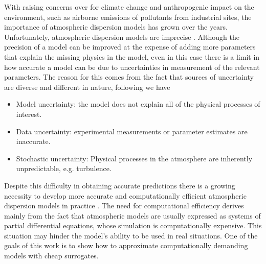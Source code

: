 \documentclass{sfuthesis}
\begin{document}
With raising concerns over for climate change and anthropogenic impact on the environment, such as 
airborne emissions of pollutants from industrial sites, 
the importance of atmospheric dispersion models has grown over the years. Unfortunately,
atmospheric dispersion models are imprecise \cite{chatwin1982use,lewellen1989meteorological}. 
Although the precision of a model can be improved at the expense
of adding more parameters that explain the missing physics in the model, even
in this case there is a limit in how accurate a model can be due to uncertainties
in measurement of the relevant parameters.
The reason for this comes from the fact that sources of uncertainty
are diverse and different in nature, following  \cite{rao2005uncertainty}
we have 


\begin{itemize}
\item Model uncertainty: the model does not explain all of the physical processes of interest.
\item Data uncertainty: experimental measurements or parameter estimates are inaccurate.
\item Stochastic uncertainty: Physical processes in the atmosphere are inherently unpredictable, e.g. turbulence.
\end{itemize}
Despite this difficulty in obtaining accurate predictions
there is a  growing necessity to develop
more accurate and computationally efficient atmospheric dispersion models in practice \cite{leelHossy2014dispersion}. 
The need for computational efficiency derives mainly from the fact that atmospheric models are usually expressed as systems
of partial differential equations, whose simulation is computationally expensive. This situation may hinder
the model's ability to be used in real situations. One of the goals of this work is to show how to
approximate computationally demanding models with  cheap surrogates. 
\end{document}
